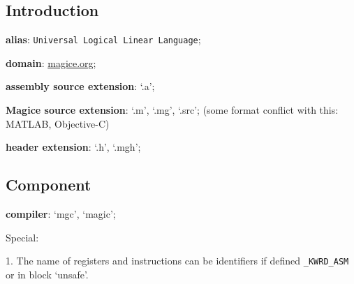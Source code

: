 
\subsection{Introduction}

\textbf{alias}: \texttt{Universal Logical Linear Language};

\textbf{domain}: \href{http://magice.org}{magice.org};

\textbf{assembly source extension}: `.a';

\textbf{Magice source extension}: `.m', `.mg', `.src'; (some format conflict with this: MATLAB, Objective-C)

\textbf{header extension}: `.h', `.mgh';

\subsection{Component}

\textbf{compiler}: `mgc', `magic';

Special:

1. The name of registers and instructions can be identifiers if defined \verb|_KWRD_ASM| or in block `unsafe'.